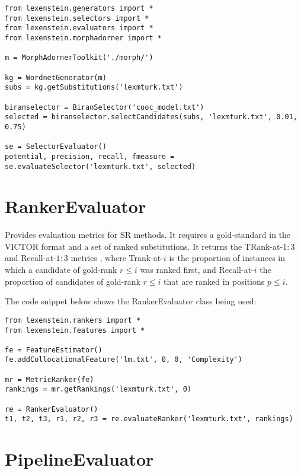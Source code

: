 \begin{lstlisting}
from lexenstein.generators import *
from lexenstein.selectors import *
from lexenstein.evaluators import *
from lexenstein.morphadorner import *

m = MorphAdornerToolkit('./morph/')

kg = WordnetGenerator(m)
subs = kg.getSubstitutions('lexmturk.txt')

biranselector = BiranSelector('cooc_model.txt')
selected = biranselector.selectCandidates(subs, 'lexmturk.txt', 0.01, 0.75)

se = SelectorEvaluator()
potential, precision, recall, fmeasure = se.evaluateSelector('lexmturk.txt', selected)
\end{lstlisting}









\section{RankerEvaluator}

Provides evaluation metrics for SR methods. It requires a gold-standard in the VICTOR format and a set of ranked substitutions. It returns the TRank-at-$1:3$ and Recall-at-$1:3$ metrics \cite{semeval}, where Trank-at-$i$ is the proportion of instances in which a candidate of gold-rank $r\leq i$ was ranked first, and Recall-at-$i$ the proportion of candidates of gold-rank $r\leq i$ that are ranked in positions $p\leq i$.

The code snippet below shows the RankerEvaluator class being used:

\begin{lstlisting}
from lexenstein.rankers import *
from lexenstein.features import *

fe = FeatureEstimator()
fe.addCollocationalFeature('lm.txt', 0, 0, 'Complexity')

mr = MetricRanker(fe)
rankings = mr.getRankings('lexmturk.txt', 0)

re = RankerEvaluator()
t1, t2, t3, r1, r2, r3 = re.evaluateRanker('lexmturk.txt', rankings)
\end{lstlisting}












\section{PipelineEvaluator}


